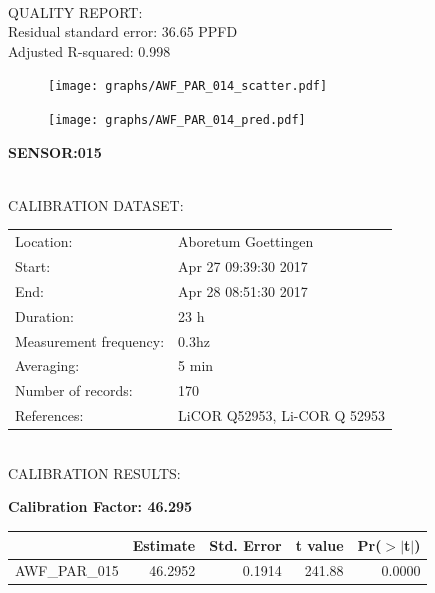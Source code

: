 \documentclass[oneside]{report}
\begin{document}
\hrulefill\\
QUALITY REPORT:\\
Residual standard error: 36.65 PPFD\\
Adjusted R-squared: 0.998



\begin{figure}[H]
  \centering
  \texttt{[image: graphs/AWF\_PAR\_014\_scatter.pdf]}
\end{figure}




\begin{figure}[H]
  \centering
  \texttt{[image: graphs/AWF\_PAR\_014\_pred.pdf]}
\end{figure}

\pagebreak


\begin{center}
\large{\textbf{SENSOR:015}}\\
\end{center}

\hrulefill\\
CALIBRATION DATASET:\\
\begin{table}[h!]
  \centering
  \label{tab:table1}
  \begin{tabular}{ll}
    Location: & Aboretum Goettingen\\ 
    
    
    Start:  & Apr 27 09:39:30 2017 \\
    End:   & Apr 28 08:51:30 2017\\ 
    Duration: & 23 h\\
    Measurement frequency: & 0.3hz\\
    Averaging:  &5 min\\
    Number of records: & 170 \\
    References: & LiCOR Q52953, Li-COR Q 52953 \\
  \end{tabular}
\end{table}

\hrulefill\\
CALIBRATION RESULTS:\\


\begin{center}
\textbf{\large{Calibration Factor: 46.295}}\\
\end{center}
\begin{table}[ht]
\centering
\begin{tabular}{rrrrr}
  \hline
 & Estimate & Std. Error & t value & Pr($>$$|$t$|$) \\ 
  \hline
AWF\_PAR\_015 & 46.2952 & 0.1914 & 241.88 & 0.0000 \\ 
   \hline
\end{tabular}
\end{table}
\end{document}
